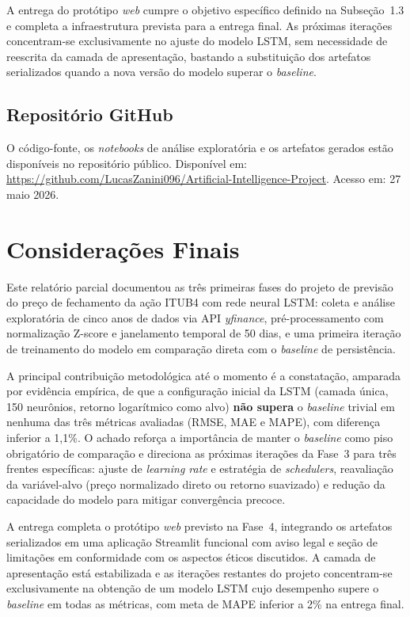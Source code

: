 \documentclass[12pt]{article}
\begin{document}
A entrega do protótipo \textit{web} cumpre o objetivo específico definido
na Subseção~1.3 e completa a infraestrutura prevista para a entrega final.
As próximas iterações concentram-se exclusivamente no ajuste do modelo
LSTM, sem necessidade de reescrita da camada de apresentação, bastando
a substituição dos artefatos serializados quando a nova versão do modelo
superar o \textit{baseline}.

\subsection{Repositório GitHub}

O código-fonte, os \textit{notebooks} de análise exploratória e os artefatos
gerados estão disponíveis no repositório público.
Disponível em: \url{https://github.com/LucasZanini096/Artificial-Intelligence-Project}.
Acesso em: 27 maio 2026.

\section{Considerações Finais}

Este relatório parcial documentou as três primeiras fases do projeto de
previsão do preço de fechamento da ação ITUB4 com rede neural LSTM:
coleta e análise exploratória de cinco anos de dados via API
\textit{yfinance}, pré-processamento com normalização Z-score e janelamento
temporal de 50 dias, e uma primeira iteração de treinamento do modelo em
comparação direta com o \textit{baseline} de persistência.

A principal contribuição metodológica até o momento é a constatação,
amparada por evidência empírica, de que a configuração inicial da LSTM
(camada única, 150 neurônios, retorno logarítmico como alvo) \textbf{não
supera} o \textit{baseline} trivial em nenhuma das três métricas avaliadas
(RMSE, MAE e MAPE), com diferença inferior a 1,1\%. O achado reforça a
importância de manter o \textit{baseline} como piso obrigatório de
comparação e direciona as próximas iterações da Fase~3 para três frentes
específicas: ajuste de \textit{learning rate} e estratégia de
\textit{schedulers}, reavaliação da variável-alvo (preço normalizado direto
ou retorno suavizado) e redução da capacidade do modelo para mitigar
convergência precoce.

A entrega completa o protótipo \textit{web} previsto na Fase~4, integrando
os artefatos serializados em uma aplicação Streamlit funcional com aviso
legal e seção de limitações em conformidade com os aspectos éticos
discutidos. A camada de apresentação está estabilizada e as iterações
restantes do projeto concentram-se exclusivamente na obtenção de um modelo
LSTM cujo desempenho supere o \textit{baseline} em todas as métricas, com
meta de MAPE inferior a 2\% na entrega final.



\end{document}
